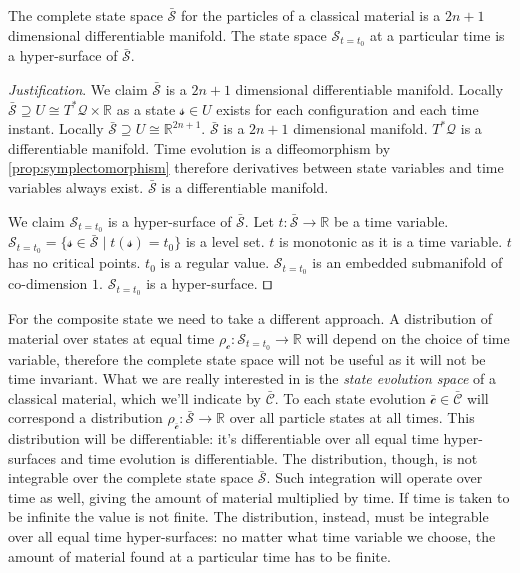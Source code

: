 \documentclass[smallextended]{svjour3}
\numberwithin{equation}{section}
\newenvironment{justification}{\emph{Justification}.}{\hfill\(\qed\)}
\begin{document}
\begin{prop}\label{prop:complete_particle_state_space}
	The complete state space $\bar{\mathcal{S}}$ for the particles of a classical material is a $2n+1$ dimensional differentiable manifold. The state space $\mathcal{S}_{t=t_0}$ at a particular time is a hyper-surface of $\bar{\mathcal{S}}$.
\end{prop}

\begin{justification}
	We claim $\bar{\mathcal{S}}$ is a $2n+1$ dimensional differentiable manifold. Locally $\bar{\mathcal{S}} \supseteq U \cong T^*\mathcal{Q}\times \mathbb{R}$ as a state $\mathcal{s} \in U$ exists for each configuration and each time instant. Locally $\bar{\mathcal{S}} \supseteq U \cong\mathbb{R}^{2n+1}$. $\bar{\mathcal{S}}$ is a $2n+1$ dimensional manifold. $T^*\mathcal{Q}$ is a differentiable manifold. Time evolution is a diffeomorphism by \ref{prop:symplectomorphism} therefore derivatives between state variables and time variables always exist. $\bar{\mathcal{S}}$ is a differentiable manifold.
	
	We claim $\mathcal{S}_{t=t_0}$ is a hyper-surface of $\bar{\mathcal{S}}$. Let $t : \bar{\mathcal{S}} \rightarrow \mathbb{R}$ be a time variable. $\mathcal{S}_{t=t_0} = \{ \mathcal{s} \in \bar{\mathcal{S}} \; | \; t(\mathcal{s}) = t_0 \}$ is a level set. $t$ is monotonic as it is a time variable. $t$ has no critical points. $t_0$ is a regular value. $\mathcal{S}_{t=t_0}$ is an embedded submanifold of co-dimension $1$. $\mathcal{S}_{t=t_0}$ is a hyper-surface.
\end{justification}

For the composite state we need to take a different approach. A distribution of material over states at equal time $\rho_\mathcal{c} : \mathcal{S}_{t=t_0} \rightarrow \mathbb{R}$ will depend on the choice of time variable, therefore the complete state space will not be useful as it will not be time invariant. What we are really interested in is the \emph{state evolution space} of a classical material, which we'll indicate by $\bar{\mathcal{C}}$. To each state evolution $\bar{\mathcal{c}} \in \bar{\mathcal{C}}$ will correspond a distribution $\rho_{\bar{\mathcal{c}}} : \bar{\mathcal{S}} \rightarrow \mathbb{R}$ over all particle states at all times. This distribution will be differentiable: it's differentiable over all equal time hyper-surfaces and time evolution is differentiable. The distribution, though, is not integrable over the complete state space $\bar{\mathcal{S}}$. Such integration will operate over time as well, giving the amount of material multiplied by time. If time is taken to be infinite the value is not finite. The distribution, instead, must be integrable over all equal time hyper-surfaces: no matter what time variable we choose, the amount of material found at a particular time has to be finite.
\end{document}
